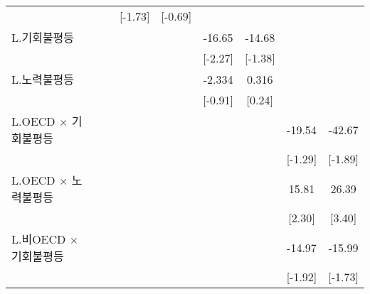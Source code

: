 \begin{table}[htbp]
{\begin{tabular}{l*{8}{c}}
                    &                     &                     &     [-1.73]         &     [-0.69]         &                     &                     &                     &                     \\
\addlinespace
L.기회불평등        &                     &                     &                     &                     &      -16.65\sym{**} &      -14.68         &                     &                     \\
                    &                     &                     &                     &                     &     [-2.27]         &     [-1.38]         &                     &                     \\
\addlinespace
L.노력불평등        &                     &                     &                     &                     &      -2.334         &       0.316         &                     &                     \\
                    &                     &                     &                     &                     &     [-0.91]         &      [0.24]         &                     &                     \\
\addlinespace
L.OECD $\times$ 기회불평등&                     &                     &                     &                     &                     &                     &      -19.54         &      -42.67\sym{*}  \\
                    &                     &                     &                     &                     &                     &                     &     [-1.29]         &     [-1.89]         \\
\addlinespace
L.OECD $\times$ 노력불평등&                     &                     &                     &                     &                     &                     &       15.81\sym{**} &       26.39\sym{***}\\
                    &                     &                     &                     &                     &                     &                     &      [2.30]         &      [3.40]         \\
\addlinespace
L.비OECD $\times$ 기회불평등&                     &                     &                     &                     &                     &                     &      -14.97\sym{*}  &      -15.99\sym{*}  \\
                    &                     &                     &                     &                     &                     &                     &     [-1.92]        &     [-1.73]         \\

\end{tabular}}
\end{table}
